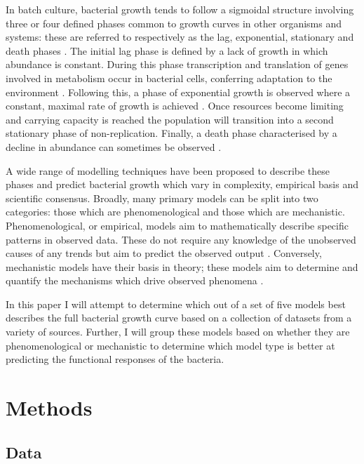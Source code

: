 \documentclass[11pt]{article}
\begin{document}
\begin{linenumbers}
        In batch culture, bacterial growth tends to follow a sigmoidal structure involving three or four defined phases common to growth curves in other organisms and systems: these are referred to respectively as the lag, exponential, stationary and death phases \citep{najafpour_chapter_2007}. The initial lag phase is defined by a lack of growth in which abundance is constant. During this phase transcription and translation of genes involved in metabolism occur in bacterial cells, conferring adaptation to the environment \citep{buchanan_when_1997}. Following this, a phase of exponential growth is observed where a constant, maximal rate of growth is achieved \citep{najafpour_chapter_2007}. Once resources become limiting and carrying capacity is reached the population will transition into a second stationary phase of non-replication. Finally, a death phase characterised by a decline in abundance can sometimes be observed \citep{zwietering_modeling_1990}.
        
        A wide range of modelling techniques have been proposed to describe these phases and predict bacterial growth which vary in complexity, empirical basis and scientific consensus. Broadly, many primary models can be split into two categories: those which are phenomenological and those which are mechanistic. Phenomenological, or empirical, models aim to mathematically describe specific patterns in observed data. These do not require any knowledge of the unobserved causes of any trends but aim to predict the observed output \citep{vlazaki_integrating_2019}. Conversely, mechanistic models have their basis in theory; these models aim to determine and quantify the mechanisms which drive observed phenomena \citep{ferrer_mathematical_2009}. 
        
        In this paper I will attempt to determine which out of a set of five models best describes the full bacterial growth curve based on a collection of datasets from a variety of sources. Further, I will group these models based on whether they are phenomenological or mechanistic to determine which model type is better at predicting the functional responses of the bacteria.


    \section{Methods}

        \subsection{Data}


\end{linenumbers}
\end{document}
